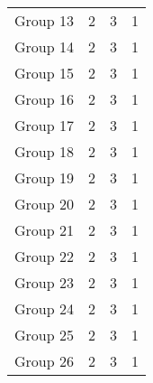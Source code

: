 \begin{table}[H]
\begin{tabular}{@{}rccc@{}}
        Group 13 & 2                                         & 3                                          & 1                                      \\
        Group 14 & 2                                         & 3                                          & 1                                      \\
        Group 15 & 2                                         & 3                                          & 1                                      \\
        Group 16 & 2                                         & 3                                          & 1                                      \\
        Group 17 & 2                                         & 3                                          & 1                                      \\
        Group 18 & 2                                         & 3                                          & 1                                      \\
        Group 19 & 2                                         & 3                                          & 1                                      \\
        Group 20 & 2                                         & 3                                          & 1                                      \\
        Group 21 & 2                                         & 3                                          & 1                                      \\
        Group 22 & 2                                         & 3                                          & 1                                      \\
        Group 23 & 2                                         & 3                                          & 1                                      \\
        Group 24 & 2                                         & 3                                          & 1                                      \\
        Group 25 & 2                                         & 3                                          & 1                                      \\
        Group 26 & 2                                         & 3                                          & 1                                      \\

\end{tabular}
\end{table}
